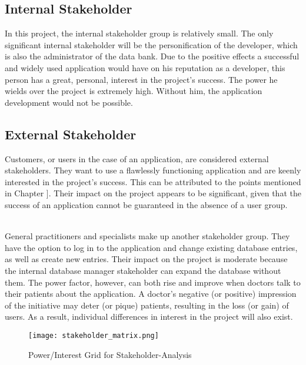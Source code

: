 \subsection{Internal Stakeholder}
In this project, the internal stakeholder group is relatively small. The only significant internal stakeholder will be the personification of the developer, which is also the administrator of the data bank. Due to the positive effects a successful and widely used application would have on his reputation as a developer, this person has a great, personal, interest in the project's success. The power he wields over the project is extremely high. Without him, the application development would not be possible. 

\subsection{External Stakeholder}
Customers, or users in the case of an application, are considered external stakeholders. They want to use a flawlessly functioning application and are keenly interested in the project's success. This can be attributed to the points mentioned in Chapter ]. Their impact on the project appears to be significant, given that the success of an application cannot be guaranteed in the absence of a user group.

\noindent \\
General practitioners and specialists make up another stakeholder group. They have the option to log in to the application and change existing database entries, as well as create new entries. Their impact on the project is moderate because the internal database manager stakeholder can expand the database without them. The power factor, however, can both rise and improve when doctors talk to their patients about the application. A doctor's negative (or positive) impression of the initiative may deter (or pique) patients, resulting in the loss (or gain) of users. As a result, individual differences in interest in the project will also exist.

\begin{figure}[h]
	\centering
	\texttt{[image: stakeholder\_matrix.png]}
	\caption[Power/Interest Grid for Stakeholder-Analysis ]{Power/Interest Grid for Stakeholder-Analysis}
\end{figure}	

